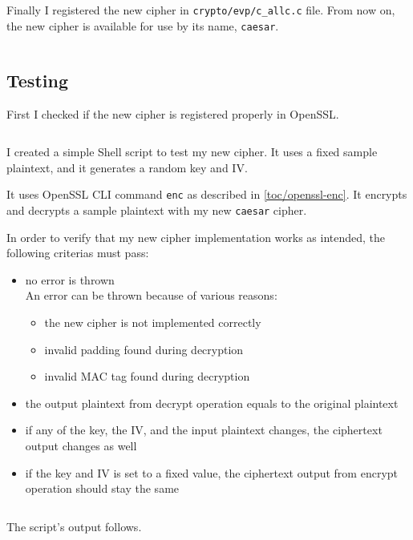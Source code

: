 \inputminted{c}{code/openssl/crypto/evp/caesar/e_caesar_ctrl.c}

Finally I registered the new cipher in \texttt{crypto/evp/c\_allc.c} file. From now on, the new cipher is available for use by its name, \texttt{caesar}.

\inputminted{c}{code/openssl/crypto/evp/c_allc.c}

\subsection{Testing}

First I checked if the new cipher is registered properly in OpenSSL.

\inputminted{text}{code/caesar-list-cipher-algorithms.txt}

I created a simple Shell script to test my new cipher. It uses a fixed sample plaintext, and it generates a random key and IV.

It uses OpenSSL CLI command \texttt{enc} as described in \autoref{toc/openssl-enc}. It encrypts and decrypts a sample plaintext with my new \texttt{caesar} cipher.

In order to verify that my new cipher implementation works as intended, the following criterias must pass:

\begin{itemize}
  \item no error is thrown \\ An error can be thrown because of various reasons:
  \begin{itemize}
    \item the new cipher is not implemented correctly
    \item invalid padding found during decryption
    \item invalid MAC tag found during decryption
  \end{itemize}
  \item the output plaintext from decrypt operation equals to the original plaintext
  \item if any of the key, the IV, and the input plaintext changes, the ciphertext output changes as well
  \item if the key and IV is set to a fixed value, the ciphertext output from encrypt operation should stay the same
\end{itemize}

\inputminted{bash}{code/test-enc.sh}

The script's output follows.

